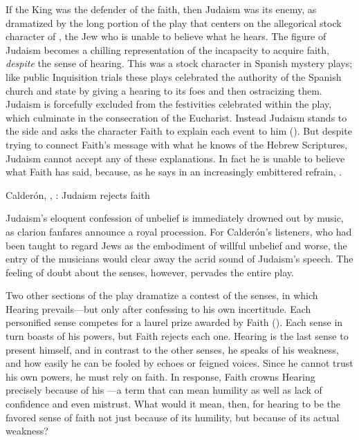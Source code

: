 If the King was the defender of the faith, then Judaism was its enemy, as
dramatized by the long portion of the play that centers on the allegorical
stock character of , the Jew who is unable to believe what he
hears.
The figure of Judaism becomes a chilling representation of the incapacity to
acquire faith, \emph{despite} the sense of hearing.
This was a stock character in Spanish mystery plays; like public Inquisition
trials these plays celebrated the authority of the Spanish church and state by
giving a hearing to its foes and then ostracizing them.
Judaism is forcefully excluded from the festivities celebrated within the play,
which culminate in the consecration of the Eucharist.
Instead Judaism stands to the side and asks the character Faith to explain each
event to him ().
But despite trying to connect Faith's message with what he knows of the Hebrew
Scriptures, Judaism cannot accept any of these explanations.
In fact he is unable to believe what Faith has said, because, as he says in an
increasingly embittered refrain, .


{Calderón, , :
Judaism rejects faith}

Judaism's eloquent confession of unbelief is immediately drowned out by music,
as clarion fanfares announce a royal procession.
For Calderón's listeners, who had been taught to regard Jews as the embodiment
of willful unbelief and worse, the entry of the musicians would clear away the
acrid sound of Judaism's speech.
The feeling of doubt about the senses, however, pervades the entire play.


Two other sections of the play dramatize a contest of the senses, in which
Hearing prevails---but only after confessing to his own incertitude.
Each personified sense competes for a laurel prize awarded by Faith
().
Each sense in turn boasts of his powers, but Faith rejects each one.
Hearing is the last sense to present himself, and in contrast to the other
senses, he speaks of his weakness, and how easily he can be fooled by echoes or
feigned voices.
Since he cannot trust his own powers, he must rely on faith.
In response, Faith crowns Hearing precisely because of his
---a term that can mean humility as well as lack of
confidence and even mistrust.
What would it mean, then, for hearing to be the favored sense of faith not just
because of its humility, but because of its actual weakness?

